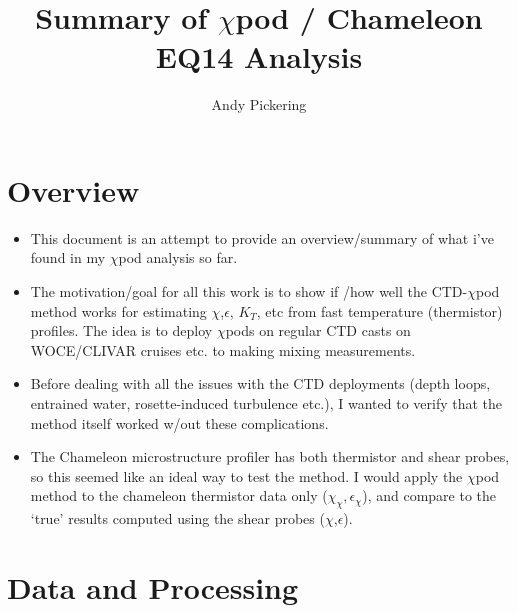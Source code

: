 \documentclass[11pt]{article}
\title{Summary of $\chi$pod / Chameleon EQ14 Analysis}
\author{Andy Pickering}
\begin{document}
\maketitle

\tableofcontents
\newpage



\section{Overview}


\begin{itemize}

\item This document is an attempt to provide an overview/summary of what i've found in my $\chi$pod analysis so far. 

\item The motivation/goal for all this work is to show if /how well the CTD-$\chi$pod method works for estimating $\chi$,$\epsilon$, $K_T$, etc from fast temperature (thermistor) profiles. The idea is to deploy $\chi$pods on regular CTD casts on WOCE/CLIVAR cruises etc. to making mixing measurements.

\item Before dealing with all the issues with the CTD deployments (depth loops, entrained water, rosette-induced turbulence etc.), I wanted to verify that the method itself worked w/out these complications. 

\item The Chameleon microstructure profiler has both thermistor and shear probes, so this seemed like an ideal way to test the method. I would apply the $\chi$pod method to the chameleon thermistor data only ($\chi_{\chi},\epsilon_{\chi}$), and compare to the `true' results computed using the shear probes ($\chi$,$\epsilon$).

\end{itemize}







\clearpage
\section{Data and Processing}
\end{document}
